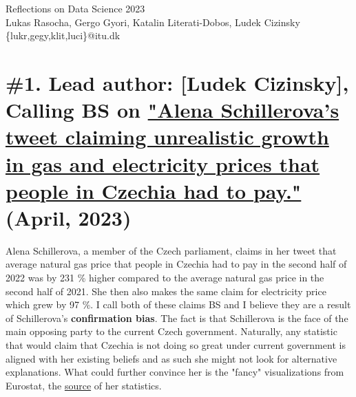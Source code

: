 \documentclass[fleqn,12pt]{article}
\begin{document}
\setlength{\baselineskip}{1.15\baselineskip}



\begin{center}
  {\Huge Reflections on Data Science 2023}\\[2ex]
  {Lukas Rasocha, Gergo Gyori, Katalin Literati-Dobos, Ludek Cizinsky}\\
  [2ex]
  {\{lukr,gegy,klit,luci\}@itu.dk}\\[2ex]
\end{center}

\tableofcontents


\parindent=20pt 
\parskip=0mm
\newpage

\section{\#1. Lead author: [Ludek Cizinsky], Calling BS on \href{https://twitter.com/alenaschillerov/status/1651167356687732736?s=20}{"Alena Schillerova's tweet claiming unrealistic growth 
in gas and electricity prices that people in Czechia had to pay."} (April, 2023)} 
Alena Schillerova, a member of the Czech parliament, claims in her tweet that average natural gas price 
that people in Czechia had to pay in the second half of 2022 was by 231 \% higher compared to the average natural gas price 
in the second half of 2021. She then also makes the same claim for electricity price which grew by 97 \%. I call both of these claims BS and I believe they are 
a result of Schillerova's \textbf{confirmation bias}. The fact is that Schillerova is the face of the main opposing party to the current Czech government. Naturally, 
any statistic that would claim that Czechia is not doing so great under current government is aligned with her existing beliefs and as such she might not look for alternative 
explanations. What could further convince her is the "fancy" visualizations from Eurostat, the \href{https://bit.ly/alenka-eurostat}{source} of her statistics.
\end{document}

